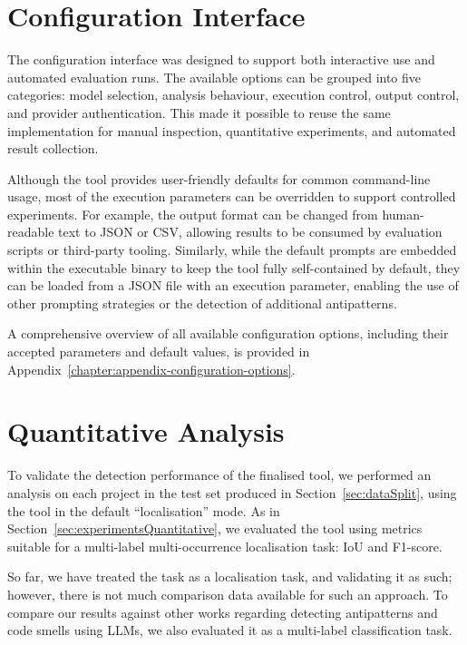 \section{Configuration Interface}\label{sec:configurationOptions}

The configuration interface was designed to support both interactive use and automated evaluation runs. The available options can be grouped into five categories: model selection, analysis behaviour, execution control, output control, and provider authentication. This made it possible to reuse the same implementation for manual inspection, quantitative experiments, and automated result collection.

Although the tool provides user-friendly defaults for common command-line usage, most of the execution parameters can be overridden to support controlled experiments. For example, the output format can be changed from human-readable text to JSON or CSV, allowing results to be consumed by evaluation scripts or third-party tooling. Similarly, while the default prompts are embedded within the executable binary to keep the tool fully self-contained by default, they can be loaded from a JSON file with an execution parameter, enabling the use of other prompting strategies or the detection of additional antipatterns.

A comprehensive overview of all available configuration options, including their accepted parameters and default values, is provided in Appendix~\ref{chapter:appendix-configuration-options}.

\section{Quantitative Analysis}\label{sec:developmentQuantitative}

To validate the detection performance of the finalised tool, we performed an analysis on each project in the test set produced in Section~\ref{sec:dataSplit}, using the tool in the default “localisation” mode. As in Section~\ref{sec:experimentsQuantitative}, we evaluated the tool using metrics suitable for a multi-label multi-occurrence localisation task: IoU and F1-score.

So far, we have treated the task as a localisation task, and validating it as such; however, there is not much comparison data available for such an approach. To compare our results against other works regarding detecting antipatterns and code smells using LLMs, we also evaluated it as a multi-label classification task.

